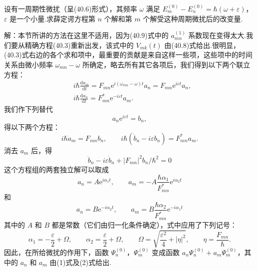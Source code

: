 \begin{xiti}

\quad 设有一周期性微扰（呈(40.6)形式），其频率 $\omega$ 满足 $E_m^{(0)}-E_n^{(0)}=\hbar(\omega+\varepsilon)$，$\varepsilon$ 是一个小量.求薛定谔方程第 $n$ 个解和第 $m$ 个解受这种周期微扰后的改变量.

解：本节所讲的方法在这里不适用，因为(40.9)式中的 $a_{mn}^{(1)}$ 系数现在变得太大.我们要从精确方程(40.3)重新出发，该式中的 $V_{mk}(t)$ 由(40.8)式给出.很明显，(40.3)式右边的各个求和项中，最重要的贡献是来自这样一些项，这些项中的时间关系由微小频率 $\omega_{mn}-\omega$ 所确定，略去所有其它各项后，我们得到以下两个联立方程：
\begin{equation*}
\begin{aligned}
  &i\hbar\frac{\mathrm{d}a_m}{\mathrm{d}t}
  =F_{mn}\mathrm{e}^{i(\omega_{mn}-\omega)t}a_n=F_{mn}\mathrm{e}^{i\varepsilon t}a_n,\\
  &i\hbar\frac{\mathrm{d}a_n}{\mathrm{d}t}=F_{mn}^{*}\mathrm{e}^{-i\varepsilon t}a_m.
\end{aligned}
\end{equation*}
我们作下列替代
\begin{equation*}
  a_n\mathrm{e}^{i\varepsilon t}=b_n,
\end{equation*}
得以下两个方程：
\begin{equation*}
  i\hbar\dot{a}_m=F_{mn}b_n,\qquad
  i\hbar\left(\dot{b}_n-i\varepsilon b_n\right)=F_{mn}^{*}a_m.
\end{equation*}
消去 $a_m$ 后，得
\begin{equation*}
  \ddot{b}_n-i\varepsilon\dot{b}_n+|F_{mn}|^2b_n/\hbar^2=0
\end{equation*}
这个方程组的两套独立解可以取成
\setcounter{equation}{0}\renewcommand{\theequation}{\arabic{equation}}%
\begin{equation}
  a_n=A\mathrm{e}^{i\alpha_1t},\qquad
  a_m=-A\frac{\hbar\alpha_1}{F_{mn}^{*}}\mathrm{e}^{i\alpha_2t}
\end{equation}
和
\begin{equation}
  a_n=B\mathrm{e}^{-i\alpha_2t},\qquad
  a_m=B\frac{\hbar\alpha_2}{F_{mn}^{*}}\mathrm{e}^{-i\alpha_1t}
\end{equation}
其中的 $A$ 和 $B$ 都是常数（它们由归一化条件确定），式中应用了下列记号：
\begin{equation*}
  \alpha_1=-\frac{\varepsilon}{2}+\Omega,\qquad
  \alpha_2=\frac{\varepsilon}{2}+\Omega,\qquad
  \Omega=\sqrt{\frac{\varepsilon^2}{4}+|\eta|^2},\qquad
  \eta=\frac{F_{mn}}{\hbar}.
\end{equation*}
因此，在所给微扰的作用下，函数 $\varPsi_n^{(0)}$，$\varPsi_m^{(0)}$ 变成函数 $a_n\varPsi_n^{(0)}+a_m\varPsi_m^{(0)}$，其中的 $a_n$ 和 $a_m$ 由(1)式及(2)式给出.


\end{xiti}
